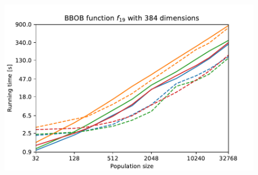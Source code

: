 \begin{figure}[ht!]
\begin{minipage}[t]{0.32\textwidth}
        \includegraphics[width=\textwidth]{img/runs/time_es_mutation_fn19_384d.pdf}
    \end{minipage}


\end{figure}
